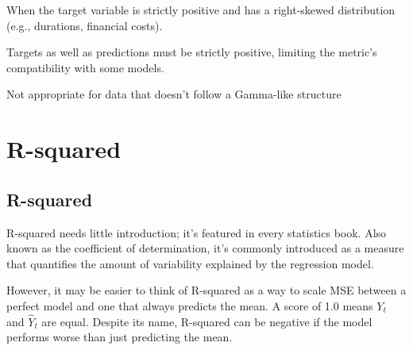 When the target variable is strictly positive and has a right-skewed distribution (e.g., durations, financial costs).

{
    \item Targets as well as predictions must be strictly positive, limiting the metric’s compatibility with some models.
    \item Not appropriate for data that doesn't follow a Gamma-like structure
}

\clearpage
\section{R-squared}
\subsection{R-squared}
\thispagestyle{regressionstyle}

R-squared needs little introduction; it's featured in every statistics book. Also known as the coefficient of determination, it's commonly introduced as a measure that quantifies the amount of variability explained by the regression model.

\begin{center}
\end{center}

However, it may be easier to think of R-squared as a way to scale MSE between a perfect model and one that always predicts the mean. A score of 1.0 means $Y_t$ and $\hat{Y}_t$ are equal. Despite its name, R-squared can be negative if the model performs worse than just predicting the mean.

